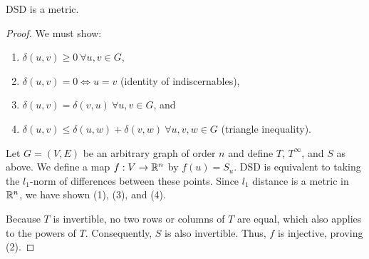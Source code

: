 \begin{theorem}
  DSD is a metric.
\end{theorem}
\begin{proof}
  We must show:

  \begin{enumerate}
  \item $\delta(u,v)\geq 0 ~ \forall u,v \in G$,
  \item $\delta(u,v) = 0 \iff u = v$ (identity of indiscernables),
  \item $\delta(u,v) = \delta(v,u) ~\forall u,v \in G$, and
  \item $\delta(u,v) \leq \delta(u,w) + \delta(v,w) ~\forall u,v,w \in G$
    (triangle inequality).
  \end{enumerate}

  Let $G = (V,E)$ be an arbitrary graph of order $n$ and define $T$, $T^\infty$,
  and $S$ as above. We define a map $f : V \to \mathbb{R}^n$ by $f(u) = S_u$. DSD is
  equivalent to taking the $l_1$-norm of differences between these points. Since
  $l_1$ distance is a metric in $\mathbb{R}^n$, we have shown (1), (3), and (4).

  Because $T$ is invertible, no two rows or columns of $T$ are equal, which also
  applies to the powers of $T$. Consequently, $S$ is also invertible. Thus,
  $f$ is injective, proving (2).




\end{proof}

